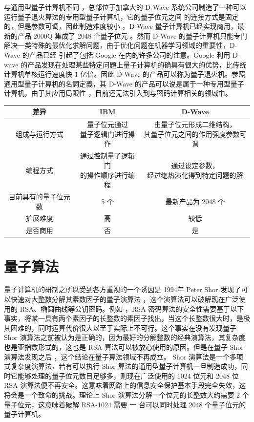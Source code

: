 与通用型量子计算机不同 ，总部位于加拿大的 D-Wave 系统公司制造了一种可以运行量子退火算法的专用型量子计算机，它的量子位元之间 的连接方式是固定的，但是参数可调，因此制造难度较小 。D-Wave 量子计算机已经实现商用，最新的产品 2000Q 集成了 2048 个量子位元 。然而 D-Wave 的量子计算机只能专门解决一类特殊的最优化求解问题，由于优化问题在机器学习领域的重要性，D-Wave 的产品已经 引起了包括 Google 在内的许多公司的注意。Google 利用 D-wave 的产品发现在处理某些特定问题上量子计算机的确具有很大的优势，比传统计算机单核运行速度快 1 亿倍。因此 D-Wave 的产品可以称为量子退火机。参照通用型量子计算机的名詞定義，其 D-Wave 的产品可以说是属于一种专用型量子计算机，由于其应用局限性 ，目前还无法引入到与密码计算相关的领域中。

\begin{center}
\begin{tabular}{ccc}
\hline
差异 & IBM & D-Wave \\
\hline
 组成与运行方式 & \thead{量子位元通过\\量子逻辑门进行操作} & \thead{由量子位元形成二维结构，\\其量子位元之间的作用强度参数可调}\\
 编程方式 & \thead{通过控制量子逻辑门\\的操作顺序进行编程} & \thead{通过设定参数，\\经过绝热演化得到特定问题的解} \\
 目前具有的量子位元数 & 5 个 & 最新产品为 2048 个 \\
 扩展难度 & 高 & 较低 \\
 是否商用 & 否 & 是 \\
\hline
\end{tabular}
\end{center}

\section{量子算法}

量子计算机的研制之所以受到各方重视的一个诱因是 1994年 Peter Shor 发现了可以快速对大整数分解其素数因子的量子演算法 ，这个演算法可以破解现在广泛使用的 RSA、椭圆曲线等公钥密码。例如 ，RSA 密码算法的安全性需要基于以下事实，将某一具有两个素因子的长整数的素因子找出，当这个长整数很大时，是极其困难的，同时运算代价很大以至于实际上不可行。这个事实在没有发现量子 Shor 演算法之前被认为是正确的，因为最好的分解整数的经典演算法，其复杂度也是亚指数形式的，这也是 RSA 算法可以被放心使用的原因。但是在量子 Shor 演算法发现之后 ，这个结论在量子算法领域不再成立。 Shor 演算法是一个多项式复杂度演算法，若有可以执行 Shor 算法的通用型量子计算机一旦制造成功，同时它能够处理的量子位元数目足够多，则现在广泛使用的 1024 位元和 2048 位 RSA 演算法便不再安全。这意味着网路上的信息安全保护基本手段完全失效，这将会是一个致命的挑战。理论上 Shor 演算法分解一个位元的长整数大约需要 2 个量子位元，这意味着破解 RSA-1024 需要 一 台可以同时处理 2048 个量子位元的量子计算机。

